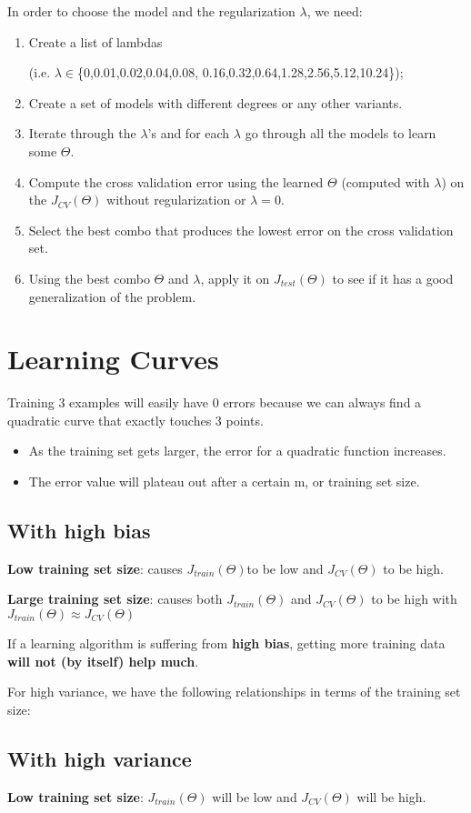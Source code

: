 In order to choose the model and the regularization $\lambda$, we need:
\begin{enumerate}
\item Create a list of lambdas 

(i.e. $\lambda\in$\{0,0.01,0.02,0.04,0.08,
0.16,0.32,0.64,1.28,2.56,5.12,10.24\});
\item Create a set of models with different degrees or any other variants.
\item Iterate through the $\lambda$'s and for each $\lambda$ go through all the models to learn some $\Theta$.
\item Compute the cross validation error using the learned $\Theta$ (computed with $\lambda$) on the $J_{CV}(\Theta)$ without regularization or $\lambda = 0$.
\item Select the best combo that produces the lowest error on the cross validation set.
\item Using the best combo $\Theta$ and $\lambda$, apply it on $J_{test}(\Theta)$ to see if it has a good generalization of the problem.
\end{enumerate}
\section{Learning Curves}
Training 3 examples will easily have 0 errors because we can always find a quadratic curve that exactly touches 3 points.
\begin{itemize}
\item As the training set gets larger, the error for a quadratic function increases.
\item The error value will plateau out after a certain m, or training set size.
\end{itemize}
\subsection{With high bias}
\textbf{Low training set size}: causes $J_{train}(\Theta)$to be low and $J_{CV}(\Theta)$ to be high.

\textbf{Large training set size}: causes both $J_{train}(\Theta)$ and $J_{CV}(\Theta)$ to be high with $J_{train}(\Theta) \approx J_{CV}(\Theta)$

If a learning algorithm is suffering from \textbf{high bias}, getting more training data \textbf{will not (by itself) help much}.

For high variance, we have the following relationships in terms of the training set size:
\subsection{With high variance}
\textbf{Low training set size}: $J_{train}(\Theta)$ will be low and $J_{CV}(\Theta)$ will be high.

